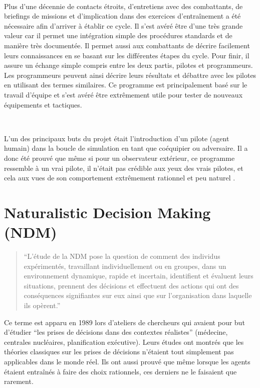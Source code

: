 ~\par
Plus d'une décennie de contacts étroits, d'entretiens avec des combattants, de briefings de missions et d'implication dans des exercices d'entraînement a été nécessaire afin d’arriver à établir ce cycle. Il s’est avéré être d’une très grande valeur car il permet une intégration simple des procédures standards et de manière très documentée. Il permet aussi aux combattants de décrire facilement leurs connaissances en se basant sur les différentes étapes du cycle. Pour finir, il assure un échange simple compris entre les deux partis, pilotes et programmeurs. Les programmeurs peuvent ainsi décrire leurs résultats et débattre avec les pilotes en utilisant des termes similaires. Ce programme est principalement  basé sur le travail d’équipe et s’est avéré être extrêmement utile pour tester de nouveaux équipements et tactiques.

~\par
L’un des principaux buts du projet était l’introduction d’un pilote (agent humain) dans la boucle de simulation en tant que coéquipier ou adversaire. Il a donc été prouvé que même si pour un observateur extérieur, ce programme ressemble à un vrai pilote, il n’était pas crédible aux yeux des vrais pilotes, et cela aux vues de son comportement extrêmement rationnel et peu naturel \parencite{norling2000enhancing}.


\section{Naturalistic Decision Making (NDM)} \label{ndm}

\begin{quotation}
“L’étude de la NDM  pose la question de comment des individus expérimentés, travaillant individuellement ou en groupes, dans un environnement dynamique, rapide et incertain, identifient et évaluent leurs situations, prennent des décisions et effectuent des actions qui ont des conséquences signifiantes sur eux ainsi que sur l'organisation dans laquelle ils opèrent.” \parencite{zsambok2014naturalistic} \end{quotation} 



Ce terme est apparu en 1989 lors d’ateliers de chercheurs qui avaient pour but d’étudier 
“les prises de décisions dans des contextes réalistes” (médecine, centrales nucléaires, planification exécutive). Leurs études ont montrés que les théories classiques sur les prises de décisions n’étaient tout simplement pas applicables dans le monde réel. Ils ont aussi prouvé que même lorsque les agents étaient entraînés à faire des choix rationnels, ces derniers ne le faisaient que rarement.

